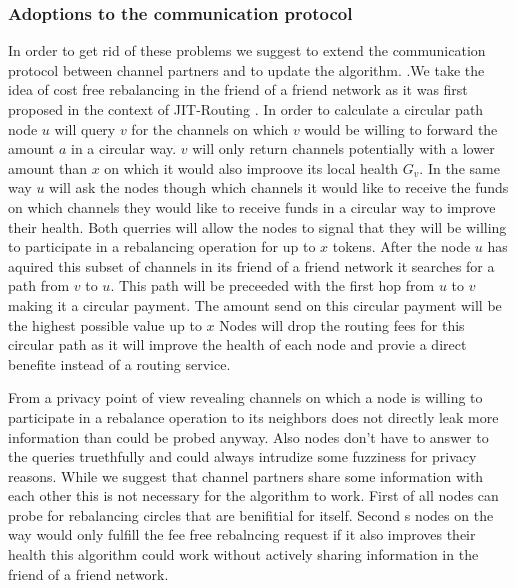 \documentclass[a4paper]{paper}
\begin{document}
\subsubsection{Adoptions to the communication protocol}
In order to get rid of these problems we suggest to extend the communication protocol between channel partners and to update the algorithm.
.We take the idea of cost free rebalancing in the friend of a friend network as it was first proposed in the context of JIT-Routing \cite{pickhardt2019jit}.
In order to calculate a circular path node $u$ will query $v$ for the channels on which $v$ would be willing to forward the amount $a$ in a circular way.
$v$ will only return channels potentially with a lower amount than $x$ on which it  would also improove its local health $G_{v}$.
In the same way $u$ will ask the nodes though which channels it would like to receive the funds on which channels they would like to receive funds in a circular way to improve their health.
Both querries will allow the nodes to signal that they will be willing to participate in a rebalancing operation for up to $x$ tokens.
After the node $u$ has aquired this subset of channels in its friend of a friend network it searches for a path from $v$ to $u$.
This path will be preceeded with the first hop from $u$ to $v$ making it a circular payment.
The amount send on this circular payment will be the highest possible value up to $x$
Nodes will drop the routing fees for this circular path as it will improve the health of each node and provie a direct benefite instead of a routing service.

From a privacy point of view revealing channels on which a node is willing to participate in a rebalance operation to its neighbors does not directly leak more information than could be probed anyway.
Also nodes don't have to answer to the queries truethfully and could always intrudize some fuzziness for privacy reasons. 
While we suggest that channel partners share some information with each other this is not necessary for the algorithm to work.
First of all nodes can probe for rebalancing circles that are benifitial for itself.
Second s nodes on the way would only fulfill the fee free rebalncing request if it also improves their health this algorithm could work without actively sharing information in the friend of a friend network.
\end{document}
